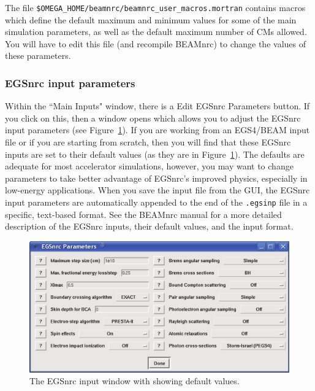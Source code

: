 \documentclass[12pt,twoside]{article}
\begin{document}
The file {\tt \$OMEGA\_HOME/beamnrc/beamnrc\_user\_macros.mortran} contains
macros which define the default maximum and minimum values for some of
the main simulation parameters, as
well as the default maximum number of CMs allowed.  You will have to
edit this file (and recompile BEAMnrc) to change the values of these
parameters.

\subsubsection{EGSnrc input parameters}
\label{egsnrcinputsect}
Within the ``Main Inputs" window, there is a {\sf Edit EGSnrc Parameters}
button.  If you click on this, then a window opens which allows you to
adjust the EGSnrc input parameters (see Figure~\ref{egsnrcwindow}).
If you are working from an EGS4/BEAM input file or if you are starting
from scratch, then you will find that these EGSnrc inputs are set
to their default values (as they are in Figure~\ref{egsnrcwindow}).
The defaults are adequate for most accelerator simulations, however, you
may want to change parameters to take better advantage of EGSnrc's
improved physics, especially in low-energy applications.  When you save
the input file from the GUI, the EGSnrc input parameters are automatically
appended to the end of the {\tt .egsinp} file in a specific, text-based
format.  See the BEAMnrc manual for a more detailed description of the
EGSnrc inputs, their default values, and the input format.

\begin{figure}[htb]
\begin{center}
\leavevmode
\includegraphics[width=14cm]{figures/egsnrc_inputs}
\end{center}
\caption{The EGSnrc input window with showing default values.}
\label{egsnrcwindow}
\end{figure}
\end{document}
